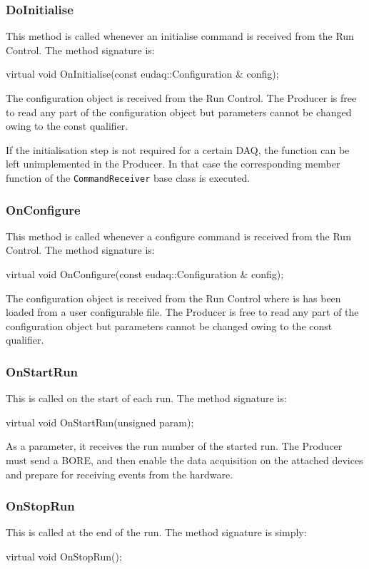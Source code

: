 \subsubsection{DoInitialise}
This method is called whenever an initialise command is received from the Run Control.
The method signature is:
\begin{listing}
virtual void OnInitialise(const eudaq::Configuration & config);
\end{listing}

The configuration object is received from the Run Control. The Producer is free to read any part of the configuration object but parameters cannot be changed owing to the const qualifier.

If the initialisation step is not required for a certain DAQ, the function can be left unimplemented in the Producer. In that case the corresponding member function of the \texttt{CommandReceiver} base class is executed.

\subsubsection{OnConfigure}\label{sec:OnConfigure}
This method is called whenever a configure command is received from the Run Control.
The method signature is:
\begin{listing}
virtual void OnConfigure(const eudaq::Configuration & config);
\end{listing}

The configuration object is received from the Run Control where is has been loaded from a user configurable file. The Producer is free to read any part of the configuration object but parameters cannot be changed owing to the const qualifier.


\subsubsection{OnStartRun}
This is called on the start of each run.
The method signature is:
\begin{listing}
virtual void OnStartRun(unsigned param);
\end{listing}

As a parameter, it receives the run number of the started run.
The Producer must send a \gls{BORE},
and then enable the data acquisition on the attached devices and prepare for receiving events from the hardware.


\subsubsection{OnStopRun}
This is called at the end of the run.
The method signature is simply:
\begin{listing}
virtual void OnStopRun();
\end{listing}

